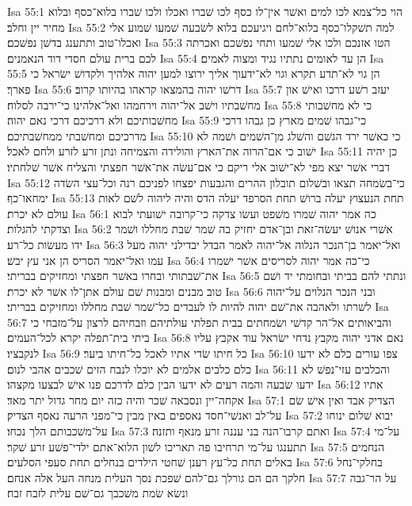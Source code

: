 Isa 55:1  הוי כל־צמא לכו למים ואשׁר אין־לו כסף לכו שׁברו ואכלו ולכו שׁברו בלוא־כסף ובלוא מחיר יין וחלב׃
Isa 55:2  למה תשׁקלו־כסף בלוא־לחם ויגיעכם בלוא לשׂבעה שׁמעו שׁמוע אלי ואכלו־טוב ותתענג בדשׁן נפשׁכם׃
Isa 55:3  הטו אזנכם ולכו אלי שׁמעו ותחי נפשׁכם ואכרתה לכם ברית עולם חסדי דוד הנאמנים׃
Isa 55:4  הן עד לאומים נתתיו נגיד ומצוה לאמים׃
Isa 55:5  הן גוי לא־תדע תקרא וגוי לא־ידעוך אליך ירוצו למען יהוה אלהיך ולקדושׁ ישׂראל כי פארך׃
Isa 55:6  דרשׁו יהוה בהמצאו קראהו בהיותו קרוב׃
Isa 55:7  יעזב רשׁע דרכו ואישׁ און מחשׁבתיו וישׁב אל־יהוה וירחמהו ואל־אלהינו כי־ירבה לסלוח׃
Isa 55:8  כי לא מחשׁבותי מחשׁבותיכם ולא דרכיכם דרכי נאם יהוה׃
Isa 55:9  כי־גבהו שׁמים מארץ כן גבהו דרכי מדרכיכם ומחשׁבתי ממחשׁבתיכם׃
Isa 55:10  כי כאשׁר ירד הגשׁם והשׁלג מן־השׁמים ושׁמה לא ישׁוב כי אם־הרוה את־הארץ והולידה והצמיחה ונתן זרע לזרע ולחם לאכל׃
Isa 55:11  כן יהיה דברי אשׁר יצא מפי לא־ישׁוב אלי ריקם כי אם־עשׂה את־אשׁר חפצתי והצליח אשׁר שׁלחתיו׃
Isa 55:12  כי־בשׂמחה תצאו ובשׁלום תובלון ההרים והגבעות יפצחו לפניכם רנה וכל־עצי השׂדה ימחאו־כף׃
Isa 55:13  תחת הנעצוץ יעלה ברושׁ תחת הסרפד יעלה הדס והיה ליהוה לשׁם לאות עולם לא יכרת׃
Isa 56:1  כה אמר יהוה שׁמרו משׁפט ועשׂו צדקה כי־קרובה ישׁועתי לבוא וצדקתי להגלות׃
Isa 56:2  אשׁרי אנושׁ יעשׂה־זאת ובן־אדם יחזיק בה שׁמר שׁבת מחללו ושׁמר ידו מעשׂות כל־רע׃
Isa 56:3  ואל־יאמר בן־הנכר הנלוה אל־יהוה לאמר הבדל יבדילני יהוה מעל עמו ואל־יאמר הסריס הן אני עץ יבשׁ׃
Isa 56:4  כי־כה אמר יהוה לסריסים אשׁר ישׁמרו את־שׁבתותי ובחרו באשׁר חפצתי ומחזיקים בבריתי׃
Isa 56:5  ונתתי להם בביתי ובחומתי יד ושׁם טוב מבנים ומבנות שׁם עולם אתן־לו אשׁר לא יכרת׃
Isa 56:6  ובני הנכר הנלוים על־יהוה לשׁרתו ולאהבה את־שׁם יהוה להיות לו לעבדים כל־שׁמר שׁבת מחללו ומחזיקים בבריתי׃
Isa 56:7  והביאותים אל־הר קדשׁי ושׂמחתים בבית תפלתי עולתיהם וזבחיהם לרצון על־מזבחי כי ביתי בית־תפלה יקרא לכל־העמים׃
Isa 56:8  נאם אדני יהוה מקבץ נדחי ישׂראל עוד אקבץ עליו לנקבציו׃
Isa 56:9  כל חיתו שׂדי אתיו לאכל כל־חיתו ביער׃
Isa 56:10  צפו עורים כלם לא ידעו כלם כלבים אלמים לא יוכלו לנבח הזים שׁכבים אהבי לנום׃
Isa 56:11  והכלבים עזי־נפשׁ לא ידעו שׂבעה והמה רעים לא ידעו הבין כלם לדרכם פנו אישׁ לבצעו מקצהו׃
Isa 56:12  אתיו אקחה־יין ונסבאה שׁכר והיה כזה יום מחר גדול יתר מאד׃
Isa 57:1  הצדיק אבד ואין אישׁ שׂם על־לב ואנשׁי־חסד נאספים באין מבין כי־מפני הרעה נאסף הצדיק׃
Isa 57:2  יבוא שׁלום ינוחו על־משׁכבותם הלך נכחו׃
Isa 57:3  ואתם קרבו־הנה בני עננה זרע מנאף ותזנה׃
Isa 57:4  על־מי תתענגו על־מי תרחיבו פה תאריכו לשׁון הלוא־אתם ילדי־פשׁע זרע שׁקר׃
Isa 57:5  הנחמים באלים תחת כל־עץ רענן שׁחטי הילדים בנחלים תחת סעפי הסלעים׃
Isa 57:6  בחלקי־נחל חלקך הם הם גורלך גם־להם שׁפכת נסך העלית מנחה העל אלה אנחם׃
Isa 57:7  על הר־גבה ונשׂא שׂמת משׁכבך גם־שׁם עלית לזבח זבח׃
